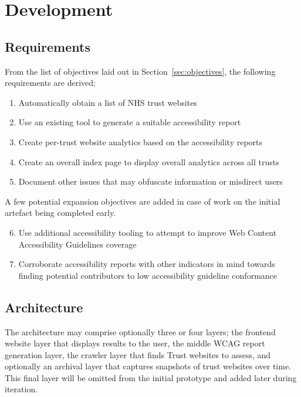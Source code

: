 \chapter{Development}\label{cha:development}


\section{Requirements}\label{sec:requirements}
From the list of objectives laid out in Section~\ref{sec:objectives}, the following requirements are derived;
\begin{enumerate}
    \item Automatically obtain a list of NHS trust websites
    \item Use an existing tool to generate a suitable accessibility report
    \item Create per-trust website analytics based on the accessibility reports
    \item Create an overall index page to display overall analytics across all trusts
    \item Document other issues that may obfuscate information or misdirect users
\end{enumerate}
A few potential expansion objectives are added in case of work on the initial artefact being completed early.
\begin{enumerate}
    \setcounter{enumi}{5} %
    \item Use additional accessibility tooling to attempt to improve Web Content Accessibility Guidelines coverage
    \item Corroborate accessibility reports with other indicators in mind towards finding potential contributors to low accessibility guideline conformance
\end{enumerate}

\section{Architecture}
The architecture may comprise optionally three or four layers; the frontend website layer that displays results to the user, the middle WCAG report generation layer, the crawler layer that finds Trust websites to assess, and optionally an archival layer that captures snapshots of trust websites over time. This final layer will be omitted from the initial prototype and added later during iteration.

